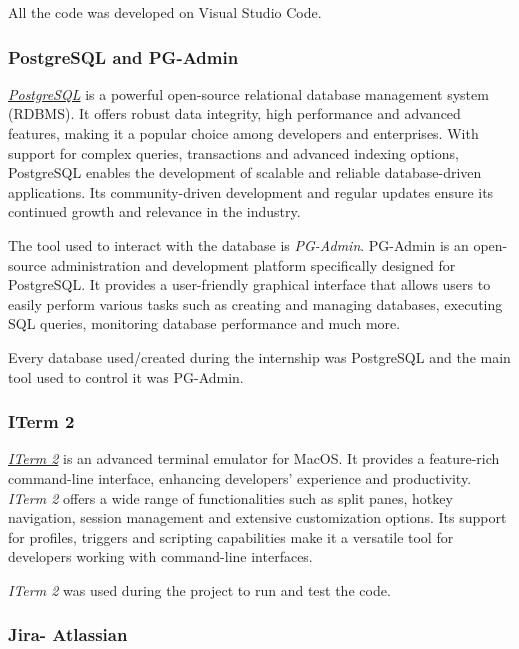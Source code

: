 All the code was developed on Visual Studio Code.

\subsubsection{PostgreSQL and PG-Admin} \label{post}

\href{https://www.postgresql.org}{\textit{PostgreSQL}} is a powerful open-source relational database management system (RDBMS). It offers robust data integrity, high performance and advanced features, making it a popular choice among developers and enterprises. With support for complex queries, transactions and advanced indexing options, PostgreSQL enables the development of scalable and reliable database-driven applications. Its community-driven development and regular updates ensure its continued growth and relevance in the industry.\newline

The tool used to interact with the database is  \textit{PG-Admin}. PG-Admin is an open-source administration and development platform specifically designed for PostgreSQL. It provides a user-friendly graphical interface that allows users to easily perform various tasks such as creating and managing databases, executing SQL queries, monitoring database performance and much more.\newline

Every database used/created during the internship was PostgreSQL and the main tool used to control it was PG-Admin.\newline


\subsubsection{ITerm 2}

\href{https://iterm2.com}{\textit{ITerm 2}} is an advanced terminal emulator for MacOS. It provides a feature-rich command-line interface, enhancing developers' experience and productivity. \textit{ITerm 2} offers a wide range of functionalities such as split panes, hotkey navigation, session management and extensive customization options. Its support for profiles, triggers and scripting capabilities make it a versatile tool for developers working with command-line interfaces.\newline

\textit{ITerm 2} was used during the project to run and test the code.

\subsubsection{Jira- Atlassian}

